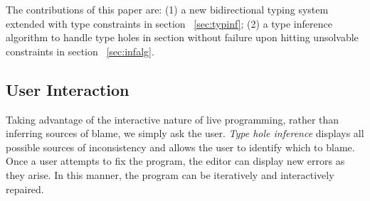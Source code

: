 The contributions of this paper are: (1) a new bidirectional typing system extended with type constraints in section ~\ref{sec:typinf}; (2) a type inference algorithm to handle type holes in section without failure upon hitting unsolvable constraints in section ~\ref{sec:infalg}.

\subsection{User Interaction}
Taking advantage of the interactive nature of live programming, rather than inferring sources of blame, we simply ask the user. \emph{Type hole inference} displays all possible sources of inconsistency and allows the user to identify which to blame. Once a user attempts to fix the program, the editor can display new errors as they arise. In this manner, the program can be iteratively and interactively repaired.

